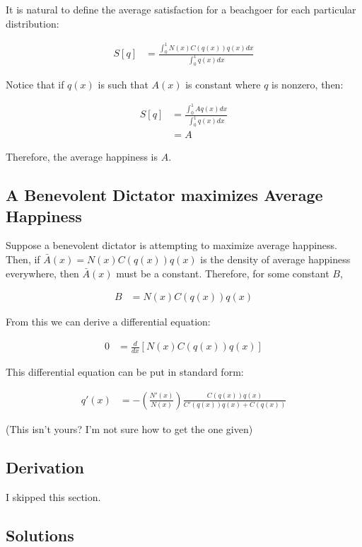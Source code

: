 \documentclass{article}
\begin{document}
It is natural to define the average satisfaction for a beachgoer
	for each particular distribution:

\begin{align}
S[q] & = \frac{ \int_0^1 N(x) C(q(x)) q(x) dx}{\int_0^1 q(x) dx}
\end{align}

Notice that if $q(x)$ is such that $A(x)$ is constant where $q$ is nonzero, then:

\begin{align}
S[q] & = \frac{ \int_0^1 A q(x) dx}{\int_0^1 q(x) dx} \nonumber \\
	& = A
\end{align}

Therefore, the average happiness is $A$.

\subsection{A Benevolent Dictator maximizes Average Happiness}

Suppose a benevolent dictator is attempting to maximize average happiness.
Then, if $\bar{A}(x) = N(x) C(q(x)) q(x)$ is the density of average happiness
	everywhere, then $\bar{A}(x)$ must be a constant.
Therefore, for some constant $B$,

\begin{align}
	B & = N(x) C(q(x)) q(x)
\end{align}

From this we can derive a differential equation:

\begin{align}
	0 & = \frac {d}{dx} \left[ N(x) C(q(x)) q(x) \right] 
\end{align}

This differential equation can be put in standard form:

\begin{align}
	q'(x) & = - \left( \frac {N'(x)}{N(x)} \right) \frac{ C(q(x)) q(x) }{C'(q(x))q(x) + C(q(x))}
\end{align}

(This isn't yours?  I'm not sure how to get the one given)

\subsection{Derivation}

I skipped this section.

\subsection{Solutions}
\end{document}

